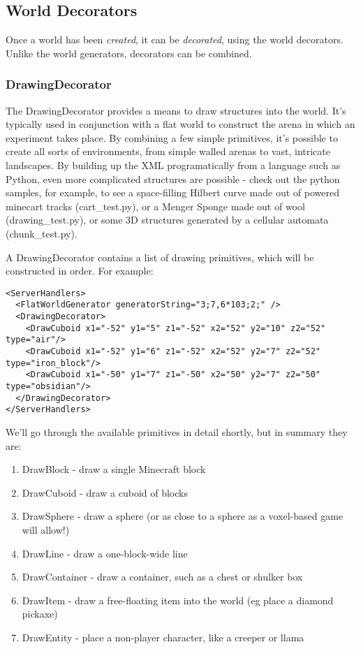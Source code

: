 \documentclass[11pt]{article} %
\begin{document}
\subsection{World Decorators}

Once a world has been \emph{created}, it can be \emph{decorated}, using the world decorators. Unlike the world generators, decorators can be combined.

\subsubsection{DrawingDecorator}
The DrawingDecorator provides a means to draw structures into the world. It's typically used in conjunction with a flat world to construct the arena in which an experiment takes place. By combining a few simple primitives, it's possible to create all sorts of environments, from simple walled arenas to vast, intricate landscapes. By building up the XML programatically from a language such as Python, even more complicated structures are possible - check out the python samples, for example, to see a space-filling Hilbert curve made out of powered minecart tracks (cart\_test.py), or a Menger Sponge made out of wool (drawing\_test.py), or some 3D structures generated by a cellular automata (chunk\_test.py).

A DrawingDecorator contains a list of drawing primitives, which will be constructed in order. For example:
\\

\begin{lstlisting}[frame=lines]
<ServerHandlers>
  <FlatWorldGenerator generatorString="3;7,6*103;2;" />
  <DrawingDecorator>
    <DrawCuboid x1="-52" y1="5" z1="-52" x2="52" y2="10" z2="52" type="air"/>
    <DrawCuboid x1="-52" y1="6" z1="-52" x2="52" y2="7" z2="52" type="iron_block"/>
    <DrawCuboid x1="-50" y1="7" z1="-50" x2="50" y2="7" z2="50" type="obsidian"/>
  </DrawingDecorator>
</ServerHandlers>
\end{lstlisting}

We'll go through the available primitives in detail shortly, but in summary they are:

\begin{enumerate}
    \item DrawBlock - draw a single Minecraft block
    \item DrawCuboid - draw a cuboid of blocks
    \item DrawSphere - draw a sphere (or as close to a sphere as a voxel-based game will allow!)
    \item DrawLine - draw a one-block-wide line
    \item DrawContainer - draw a container, such as a chest or shulker box
    \item DrawItem - draw a free-floating item into the world (eg place a diamond pickaxe)
    \item DrawEntity - place a non-player character, like a creeper or llama
\end{enumerate}
\end{document}
